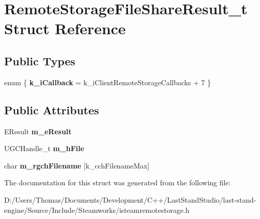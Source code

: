 \hypertarget{structRemoteStorageFileShareResult__t}{}\section{Remote\+Storage\+File\+Share\+Result\+\_\+t Struct Reference}
\label{structRemoteStorageFileShareResult__t}
\subsection*{Public Types}
\begin{DoxyCompactItemize}
\item 
\hypertarget{structRemoteStorageFileShareResult__t_a647025c78d69fc000f93ef16d1789439}{}enum \{ {\bfseries k\+\_\+i\+Callback} = k\+\_\+i\+Client\+Remote\+Storage\+Callbacks + 7
 \}\label{structRemoteStorageFileShareResult__t_a647025c78d69fc000f93ef16d1789439}

\end{DoxyCompactItemize}
\subsection*{Public Attributes}
\begin{DoxyCompactItemize}
\item 
\hypertarget{structRemoteStorageFileShareResult__t_a24ec60e265d70b4304eb4098f64e0c0d}{}E\+Result {\bfseries m\+\_\+e\+Result}\label{structRemoteStorageFileShareResult__t_a24ec60e265d70b4304eb4098f64e0c0d}

\item 
\hypertarget{structRemoteStorageFileShareResult__t_a465c5fa0eaa6bc8d61de4da74cff5c3b}{}U\+G\+C\+Handle\+\_\+t {\bfseries m\+\_\+h\+File}\label{structRemoteStorageFileShareResult__t_a465c5fa0eaa6bc8d61de4da74cff5c3b}

\item 
\hypertarget{structRemoteStorageFileShareResult__t_a2793d40e3ae7db06de1ce2087ac5c7b7}{}char {\bfseries m\+\_\+rgch\+Filename} \mbox{[}k\+\_\+cch\+Filename\+Max\mbox{]}\label{structRemoteStorageFileShareResult__t_a2793d40e3ae7db06de1ce2087ac5c7b7}

\end{DoxyCompactItemize}


The documentation for this struct was generated from the following file\+:\begin{DoxyCompactItemize}
\item 
D\+:/\+Users/\+Thomas/\+Documents/\+Development/\+C++/\+Last\+Stand\+Studio/last-\/stand-\/engine/\+Source/\+Include/\+Steamworks/isteamremotestorage.\+h\end{DoxyCompactItemize}
